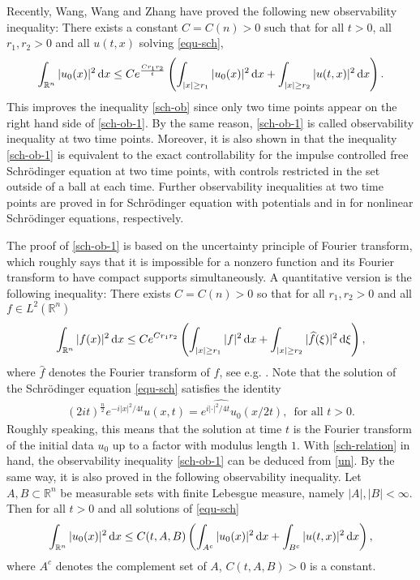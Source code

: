 \documentclass[preprint,12pt]{elsarticle}
\def\R {\mathbb{R}}
\def\d{{\,\rm d}}
\begin{document}
Recently,   Wang,  Wang and Zhang \cite{WWZ} have proved   the following new observability inequality: There exists a constant $C=C(n)>0$ such that for all $t>0$, all $r_1,r_2>0$ and all $u(t,x)$ solving \eqref{equ-sch},
\begin{equation}\label{sch-ob-1}
    \int_{\R^n}|u_0(x)|^2\d x \le C e^{\frac{Cr_1r_2}{t}}\left(\int_{|x|\ge r_1} |u_0(x)|^2\d x+\int _{|x|\ge r_2}|u(t,x)|^2\d x\right).
\end{equation}
This improves the inequality \eqref{sch-ob} since only two time points appear on the right hand side of \eqref{sch-ob-1}. By the same reason, \eqref{sch-ob-1} is called observability inequality at two time points. Moreover, it is also shown in \cite[Section 5.2]{WWZ} that the inequality \eqref{sch-ob-1} is equivalent to the exact controllability for the impulse controlled
free Schr\"{o}dinger equation at two time points, with controls restricted in the set outside of a ball at each time. Further observability inequalities at two time points are proved in \cite{Huang} for Schr\"{o}dinger equation with potentials and in \cite{wang21} for nonlinear Schr\"{o}dinger equations, respectively.

The proof of \eqref{sch-ob-1} is based on the uncertainty principle of Fourier transform, which roughly says that  it is impossible for a nonzero function and its Fourier transform to have compact supports simultaneously.
A quantitative version is the following inequality: There exists $C=C(n)>0$ so that for all $r_1,r_2>0$ and all $f\in L^2(\R^n)$
\begin{equation}\label{un}
    \int_{\R^n}|f(x)|^2\d x\le Ce^{Cr_1r_2}\left(\int_{|x|\ge r_1}|f|^2\d x+\int_{|x|\ge r_2}|\widehat{f}(\xi)|^2\d\xi\right),
\end{equation}
where $\widehat{f}$ denotes the Fourier transform of $f$, see e.g. \cite{Nazarov,Havin,Jaming}. Note that \cite{L-Ponce14} the solution of the Schr\"{o}dinger equation \eqref{equ-sch} satisfies the identity
\begin{align}\label{sch-relation}
(2it)^{\frac{n}{2}}e^{-i|x|^2/4t}u(x, t)=\widehat{e^{i|\cdot|^2/4t}u_0}(x/2t),\,\,\, \text{for all}\,\,t>0.
\end{align}
Roughly speaking, this means that the solution at time $t$ is the Fourier transform of the initial data $u_0$ up to a factor with modulus length $1$. With \eqref{sch-relation} in hand, the observability inequality \eqref{sch-ob-1} can be deduced from \eqref{un}. By the same way, it is also proved in \cite{WWZ} the following observability inequality. Let $A,B\subset \R^n$ be measurable sets with finite Lebesgue measure, namely $|A|,|B|<\infty$. Then for all $t>0$ and all solutions of \eqref{equ-sch}
\begin{equation}\label{sch-ob-2}
    \int_{\R^n}|u_0(x)|^2\d x \le C(t,A,B)\left(\int_{A^c} |u_0(x)|^2\d x+\int _{B^c}|u(t,x)|^2\d x\right),
\end{equation}
where $A^c$ denotes the complement set of $A$, $C(t,A,B)>0$ is a constant.
\end{document}
